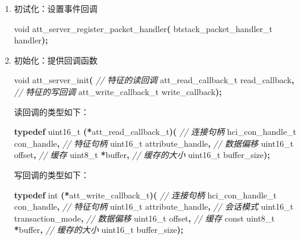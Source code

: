 \documentclass[
  12pt,
]{book}
\newenvironment{Shaded}{\begin{snugshade}}{\end{snugshade}}
\newcommand{\CommentTok}[1]{\textcolor[rgb]{0.56,0.35,0.01}{\textit{#1}}}
\newcommand{\DataTypeTok}[1]{\textcolor[rgb]{0.13,0.29,0.53}{#1}}
\newcommand{\KeywordTok}[1]{\textcolor[rgb]{0.13,0.29,0.53}{\textbf{#1}}}
\newcommand{\NormalTok}[1]{#1}
\newcommand{\OperatorTok}[1]{\textcolor[rgb]{0.81,0.36,0.00}{\textbf{#1}}}
\begin{document}
\begin{enumerate}
\def\labelenumi{\arabic{enumi}.}
\item
  初试化：设置事件回调

\begin{Shaded}
\begin{Highlighting}[]
\DataTypeTok{void}\NormalTok{ att\_server\_register\_packet\_handler}\OperatorTok{(}
\NormalTok{  btstack\_packet\_handler\_t handler}\OperatorTok{);}
\end{Highlighting}
\end{Shaded}
\item
  初始化：提供回调函数

\begin{Shaded}
\begin{Highlighting}[]
\DataTypeTok{void}\NormalTok{ att\_server\_init}\OperatorTok{(}
  \CommentTok{// 特征的读回调}
\NormalTok{  att\_read\_callback\_t read\_callback}\OperatorTok{,}
  \CommentTok{// 特征的写回调}
\NormalTok{  att\_write\_callback\_t write\_callback}\OperatorTok{);}
\end{Highlighting}
\end{Shaded}

  读回调的类型如下：

\begin{Shaded}
\begin{Highlighting}[]
\KeywordTok{typedef} \DataTypeTok{uint16\_t} \OperatorTok{(*}\NormalTok{att\_read\_callback\_t}\OperatorTok{)(}
  \CommentTok{// 连接句柄}
\NormalTok{  hci\_con\_handle\_t con\_handle}\OperatorTok{,}
  \CommentTok{// 特征句柄}
  \DataTypeTok{uint16\_t}\NormalTok{ attribute\_handle}\OperatorTok{,}
  \CommentTok{// 数据偏移}
  \DataTypeTok{uint16\_t}\NormalTok{ offset}\OperatorTok{,}
  \CommentTok{// 缓存}
  \DataTypeTok{uint8\_t} \OperatorTok{*}\NormalTok{buffer}\OperatorTok{,}
  \CommentTok{// 缓存的大小}
  \DataTypeTok{uint16\_t}\NormalTok{ buffer\_size}\OperatorTok{);}
\end{Highlighting}
\end{Shaded}

  写回调的类型如下：

\begin{Shaded}
\begin{Highlighting}[]
\KeywordTok{typedef} \DataTypeTok{int} \OperatorTok{(*}\NormalTok{att\_write\_callback\_t}\OperatorTok{)(}
  \CommentTok{// 连接句柄}
\NormalTok{  hci\_con\_handle\_t con\_handle}\OperatorTok{,}
  \CommentTok{// 特征句柄}
  \DataTypeTok{uint16\_t}\NormalTok{ attribute\_handle}\OperatorTok{,}
  \CommentTok{// 会话模式}
  \DataTypeTok{uint16\_t}\NormalTok{ transaction\_mode}\OperatorTok{,}
  \CommentTok{// 数据偏移}
  \DataTypeTok{uint16\_t}\NormalTok{ offset}\OperatorTok{,}
  \CommentTok{// 缓存}
  \DataTypeTok{const} \DataTypeTok{uint8\_t} \OperatorTok{*}\NormalTok{buffer}\OperatorTok{,}
  \CommentTok{// 缓存的大小}
  \DataTypeTok{uint16\_t}\NormalTok{ buffer\_size}\OperatorTok{);}
\end{Highlighting}
\end{Shaded}


\end{enumerate}
\end{document}
